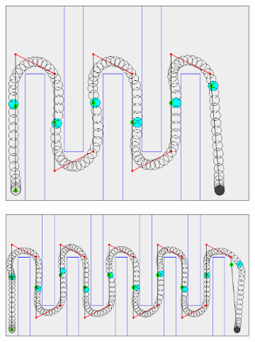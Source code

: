 \begin{figure}
	\centering
	
	\begin{subfigure}[t]{0.5\textwidth}
        		\includegraphics[width=\textwidth]{img/bench-small}
        		\caption{}
        		\label{fig:bench-small}
	\end{subfigure}
		
	\begin{subfigure}[t]{0.6\textwidth}
        		\includegraphics[width=\textwidth]{img/bench-large}
        		\caption{}
        		\label{fig:bench-large}
	\end{subfigure}	
	

\end{figure}

